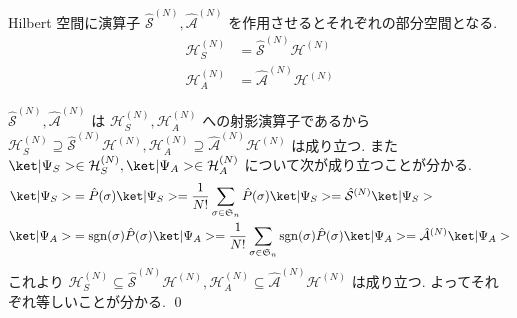 \documentclass[uplatex,dvipdfmx,a4paper,11pt]{jlreq}
\makeatletter
\DeclareMathOperator{\sgn}{sgn}
\newcommand{\HH}{\mathcal{H}}
\renewcommand{\SS}{\mathfrak{S}}
\renewcommand{\S}{\mathcal{S}}
\newcommand{\A}{\mathcal{A}}
\numberwithin{equation}{section}
\theoremstyle{definition}
\renewenvironment{proof}[1][\proofname]{\par
  \normalfont
  \topsep6\p@\@plus6\p@ \trivlist
  \item[\hskip\labelsep{\bfseries #1}\@addpunct{\bfseries}]\ignorespaces\quad\par
}{%
  \qed\endtrivlist\@endpefalse
}
\renewcommand\proofname{証明}
\makeatother
\begin{document}
\begin{lemma}
  Hilbert 空間に演算子 $\hat{\S}^{(N)}, \hat{\A}^{(N)}$ を作用させるとそれぞれの部分空間となる.
  \begin{align}
    \HH_S^{(N)} & = \hat{\S}^{(N)}\HH^{(N)} \\
    \HH_A^{(N)} & = \hat{\A}^{(N)}\HH^{(N)}
  \end{align}
  \label{hilbert corespondence}
\end{lemma}
\begin{proof}
  $\hat{\S}^{(N)}, \hat{\A}^{(N)}$ は $\HH_S^{(N)}, \HH_A^{(N)}$ への射影演算子であるから $\HH_S^{(N)} \supseteq \hat{\S}^{(N)}\HH^{(N)}, \HH_A^{(N)} \supseteq \hat{\A}^{(N)}\HH^{(N)}$ は成り立つ.
  また $\ket|\Psi_S>\in\HH_S^{(N)}, \ket|\Psi_A>\in\HH_A^{(N)}$ について次が成り立つことが分かる.
  \begin{align}
    \ket|\Psi_S> & = \hat{P}(\sigma)\ket|\Psi_S> = \frac{1}{N!}\sum_{\sigma\in\SS_n}\hat{P}(\sigma)\ket|\Psi_S> = \hat{\S}^{(N)}\ket|\Psi_S>                         \\
    \ket|\Psi_A> & = \sgn(\sigma)\hat{P}(\sigma)\ket|\Psi_A> = \frac{1}{N!}\sum_{\sigma\in\SS_n}\sgn(\sigma)\hat{P}(\sigma)\ket|\Psi_A> = \hat{\A}^{(N)}\ket|\Psi_A>
  \end{align}
  これより $\HH_S^{(N)} \subseteq \hat{\S}^{(N)}\HH^{(N)}, \HH_A^{(N)} \subseteq \hat{\A}^{(N)}\HH^{(N)}$ は成り立つ. よってそれぞれ等しいことが分かる.
\end{proof}
\end{document}
